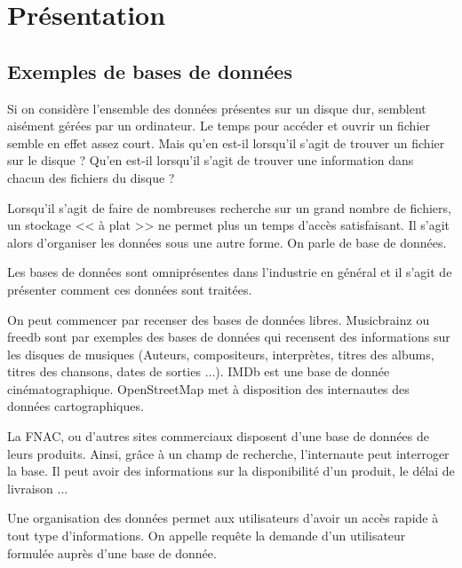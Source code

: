 \documentclass[10pt]{article}
\begin{document}
\section{Présentation}
\subsection{Exemples de bases de données}
Si on considère l'ensemble des données présentes sur un disque dur, semblent aisément gérées par un ordinateur. Le temps pour accéder et ouvrir un fichier semble en effet assez court. Mais qu'en est-il lorsqu'il s'agit de trouver un fichier sur le disque ? Qu'en est-il lorsqu'il s'agit de trouver une information dans chacun des fichiers du disque ?

Lorsqu'il s'agit de faire de nombreuses recherche sur un grand nombre de fichiers, un stockage << à plat >> ne permet plus un temps d'accès satisfaisant. Il s'agit alors d'organiser les données sous une autre forme. On parle de base de données. 

Les bases de données sont omniprésentes dans l'industrie en général et il s'agit de présenter comment ces données sont traitées. 

On peut commencer par recenser des bases de données libres. Musicbrainz ou freedb sont par exemples des bases de données qui recensent des informations sur les disques de musiques (Auteurs, compositeurs, interprètes, titres des albums, titres des chansons, dates de sorties ...). IMDb est une base de donnée cinématographique. OpenStreetMap met à disposition des internautes des données cartographiques. 

La FNAC, ou d'autres sites commerciaux disposent d'une base de données de leurs produits. Ainsi, grâce à un champ de recherche, l'internaute peut interroger la base. Il peut avoir des informations sur la disponibilité d'un produit, le délai de livraison ...

Une organisation des données permet aux utilisateurs d'avoir un accès rapide à tout type d'informations. On appelle requête la demande d'un utilisateur formulée auprès d'une base de donnée. 
\end{document}
